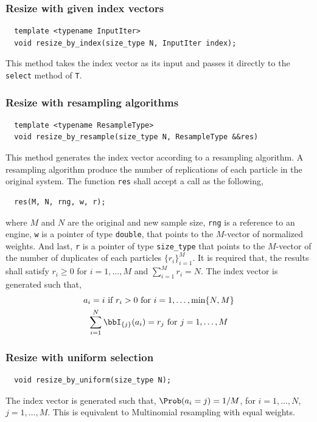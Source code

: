 \subsubsection{Resize with given index vectors}

\begin{Verbatim}
  template <typename InputIter>
  void resize_by_index(size_type N, InputIter index);
\end{Verbatim}
This method takes the index vector as its input and passes it directly to the
\verb|select| method of \verb|T|.

\subsubsection{Resize with resampling algorithms}

\begin{Verbatim}
  template <typename ResampleType>
  void resize_by_resample(size_type N, ResampleType &&res)
\end{Verbatim}
This method generates the index vector according to a resampling algorithm. A
resampling algorithm produce the number of replications of each particle in the
original system. The function \verb|res| shall accept a call as the following,
\begin{Verbatim}
  res(M, N, rng, w, r);
\end{Verbatim}
where $M$ and $N$ are the original and new sample size, \verb|rng| is a
reference to an \rng engine, \verb|w| is a pointer of type \verb|double|, that
points to the $M$-vector of normalized weights. And last, \verb|r| is a pointer
of type \verb|size_type| that points to the $M$-vector of the number of
duplicates of each particles $\{r_i\}_{i=1}^M$. It is required that, the
results shall satisfy $r_i\ge0$ for $i=1,\dots,M$ and $\sum_{i=1}^M r_i = N$.
The index vector is generated such that,
\begin{gather*}
  a_i = i \text{ if } r_i > 0 \text{ for } i = 1,\dots,\min\{N, M\} \\
  \sum_{i=1}^N\bbI_{\{j\}}(a_i) = r_j \text{ for } j = 1,\dots,M
\end{gather*}

\subsubsection{Resize with uniform selection}

\begin{Verbatim}
  void resize_by_uniform(size_type N);
\end{Verbatim}
The index vector is generated such that, $\Prob(a_i = j) = 1/M$, for $i =
1,\dots,N$, $j = 1,\dots,M$. This is equivalent to Multinomial resampling with
equal weights.

